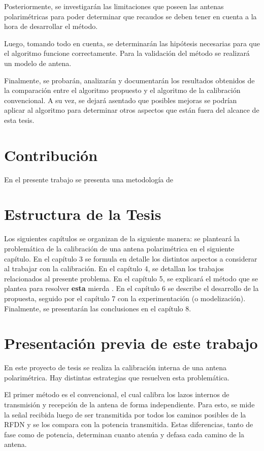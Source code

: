 Posteriormente, se investigarán las limitaciones que poseen las antenas polarimétricas para poder determinar que recaudos 
se deben tener en cuenta a la hora de desarrollar el método.

Luego, tomando todo en cuenta, se determinarán las hipótesis necesarias para que el algoritmo funcione correctamente. Para 
la validación del método se realizará un modelo de antena.

Finalmente, se probarán, analizarán y documentarán los resultados obtenidos de la comparación entre el algoritmo propuesto 
y el algoritmo de la calibración convencional. A su vez, se dejará asentado que posibles mejoras se podrían aplicar al 
algoritmo para determinar otros aspectos que están fuera del alcance de esta tesis.



\section{Contribución}

En el presente trabajo se presenta una metodología de 


\section{Estructura de la Tesis}

Los siguientes capítulos se organizan de la siguiente manera: se planteará la problemática de la calibración de una antena
polarimétrica en el siguiente capítulo. En el capítulo 3 se formula en detalle los distintos aspectos a considerar al 
trabajar con la calibración. En el capítulo 4, se detallan los trabajos relacionados al presente problema. En el capítulo 5,
se explicará el método que se plantea para resolver \textbf{esta} mierda . En el capítulo 6 se 
describe el desarrollo de la propuesta, seguido por el capítulo 7 con la experimentación (o modelización). Finalmente, se presentarán las 
conclusiones en el capítulo 8.

\section{Presentación previa de este trabajo}

En este proyecto de tesis se realiza la calibración interna de una antena polarimétrica. Hay distintas estrategias que 
resuelven esta problemática.

El primer método es el convencional, el cual calibra los lazos internos de transmisión y recepción de la antena de forma 
independiente. Para esto, se mide la señal recibida luego de ser transmitida por todos los caminos posibles de la RFDN
y se los compara con la potencia transmitida. Estas diferencias, tanto de fase como de potencia, determinan cuanto atenúa
y defasa cada camino de la antena. 

